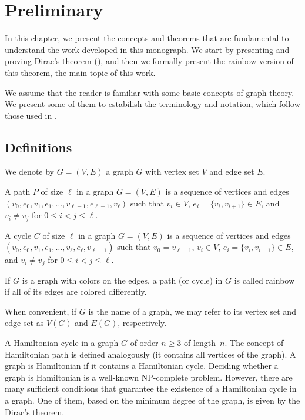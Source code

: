 
\chapter{Preliminary}

In this chapter, we present the concepts and theorems that are fundamental to understand the 
work developed in this monograph. We start by presenting and proving Dirac's theorem
(\cite{dirac1952}), 
and then we formally present the rainbow version of this theorem, the main topic of this work.

We assume that the reader is familiar with some basic concepts of graph theory. We present some 
of them to estabilish the terminology and notation, which follow those used in 
\cite{bondy1976}.

\section{Definitions}

We denote by $G = (V, E)$ a graph $G$ with vertex set $V$ and edge set $E$.

A path $P$ of size $\ell$ in a graph $G = (V, E)$ is a sequence of vertices and edges $(v_0, e_0, v_1, e_1, \ldots, v_{\ell - 1}, e_{\ell - 1}, v_{\ell})$ such that
$v_i \in V$, $e_i = \{v_i, v_{i + 1}\} \in E$, and $v_i \neq v_j$ for $0 \leq i < j \leq \ell$.

A cycle $C$ of size $\ell$ in a graph $G = (V, E)$ is a sequence of vertices and edges $(v_0, e_0, v_1, e_1, \ldots, v_{\ell}, e_{\ell}, v_{\ell + 1})$ such that
$v_{0} = v_{\ell + 1}$, $v_i \in V$, $e_i = \{v_i, v_{i + 1}\} \in E$, and $v_i \neq v_j$ for $0 \leq i < j \leq \ell$.

If $G$ is a graph with colors on the edges, a path (or cycle) in $G$ is called rainbow if all of its edges are colored differently.

When convenient, if $G$ is the name of a graph, we may refer to its vertex set and edge set as $V(G)$ and $E(G)$, respectively.

A Hamiltonian cycle in a graph $G$ of order $n \geq 3$ of length~$n$. The concept of Hamiltonian path is defined analogously (it contains all vertices of the graph).
A graph is Hamiltonian if it contains a Hamiltonian cycle.
Deciding whether a graph is Hamiltonian is a well-known NP-complete problem. 
However, there are many sufficient conditions that guarantee the existence of a Hamiltonian cycle in a graph. 
One of them, based on the minimum degree of the graph, is given by the Dirac's theorem.

